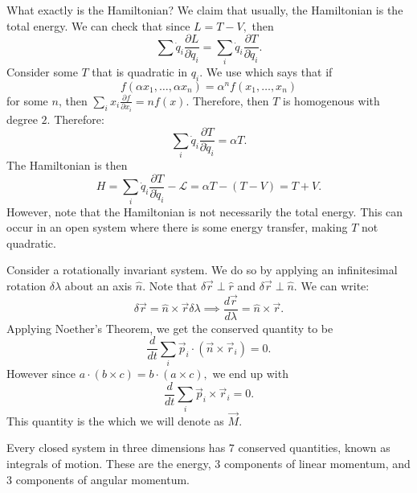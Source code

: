 \documentclass{article}
\numberwithin{equation}{section}
\begin{document}
What exactly is the Hamiltonian? We claim that usually, the Hamiltonian is the total energy. We can check that since $L=T-V,$ then 
\begin{equation}
    \sum \dot{q}_i \frac{\partial L}{\partial \dot{q}_i} = \sum_i \dot{q}_i \frac{\partial T}{\partial \dot{q}_i}.
\end{equation}
Consider some $T$ that is quadratic in $q_i$. We use  which says that if
\begin{equation}
    f(\alpha x_1, \dots, \alpha x_n) = \alpha^n f(x_1,\dots,x_n)
\end{equation}
for some $n$, then $\sum_i x_i \frac{\partial f}{\partial x_i} = n f(x).$ Therefore, then $T$ is homogenous with degree $2$. Therefore:
\begin{equation}
    \sum_i \dot{q}_i \frac{\partial T}{\partial \dot{q}_i} = \alpha T.
\end{equation}
The Hamiltonian is then
\begin{equation}
    H = \sum_i \dot{q}_i \frac{\partial T}{\partial \dot{q}_i} - \mathcal{L} = \alpha T - (T-V) = T+V.
\end{equation}
However, note that the Hamiltonian is not necessarily the total energy. This can occur in an open system where there is some energy transfer, making $T$ not quadratic.
\begin{example}
    Consider a rotationally invariant system. We do so by applying an infinitesimal rotation $\delta \lambda$ about an axis $\hat{n}.$ Note that $\delta \vec{r} \perp \hat{r}$ and $\delta \vec{r} \perp \hat{n}.$ We can write:
    \begin{equation}
        \delta \vec{r} = \hat{n} \times \vec{r} \delta\lambda \implies \frac{d\vec{r}}{d\lambda} = \hat{n} \times \vec{r}.
    \end{equation}
    Applying Noether's Theorem, we get the conserved quantity to be
    \begin{equation}
        \frac{d}{dt} \sum_i \vec{p}_i \cdot (\vec{n}\times \vec{r}_i) = 0.
    \end{equation}
    However since $a\cdot (b\times c) = b \cdot (a\times c),$ we end up with
    \begin{equation}
        \frac{d}{dt} \sum_i \vec{p}_i \times \vec{r}_i = 0.
    \end{equation}
    This quantity is the  which we will denote as $\vec{M}$.
\end{example}
Every closed system in three dimensions has $7$ conserved quantities, known as integrals of motion. These are the energy, 3 components of linear momentum, and 3 components of angular momentum.
\end{document}
